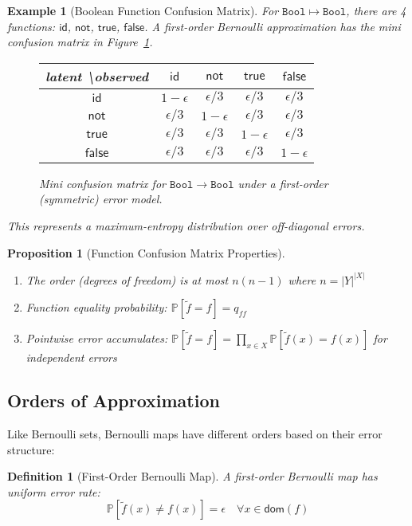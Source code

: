 \documentclass[11pt,final,hidelinks]{article}
\newtheorem{proposition}[theorem]{Proposition}
\newtheorem{definition}[theorem]{Definition}
\newtheorem{example}[theorem]{Example}
\newcommand{\obs}[1]{\widetilde{#1}}  %
\newcommand{\Type}[1]{\mathtt{#1}}
\newcommand{\Prob}[1]{\mathbb{P}\left[#1\right]}
\newcommand{\error}{\epsilon}
\newcommand{\Bool}{\Type{Bool}}
\newcommand{\Dom}{\mathsf{dom}}
\begin{document}
\begin{example}[Boolean Function Confusion Matrix]
For $\Bool \mapsto \Bool$, there are 4 functions: $\mathsf{id}$, $\mathsf{not}$, $\mathsf{true}$, $\mathsf{false}$. A first-order Bernoulli approximation has the mini confusion matrix in Figure~\ref{fig:bool-func-confusion}.
\begin{figure}[t]
\centering
\begin{tabular}{c|cccc}
latent \textbackslash observed & $\mathsf{id}$ & $\mathsf{not}$ & $\mathsf{true}$ & $\mathsf{false}$ \\
\hline
$\mathsf{id}$ & $1-\epsilon$ & $\epsilon/3$ & $\epsilon/3$ & $\epsilon/3$ \\
$\mathsf{not}$ & $\epsilon/3$ & $1-\epsilon$ & $\epsilon/3$ & $\epsilon/3$ \\
$\mathsf{true}$ & $\epsilon/3$ & $\epsilon/3$ & $1-\epsilon$ & $\epsilon/3$ \\
$\mathsf{false}$ & $\epsilon/3$ & $\epsilon/3$ & $\epsilon/3$ & $1-\epsilon$
\end{tabular}
\caption{Mini confusion matrix for $\Bool\to\Bool$ under a first-order (symmetric) error model.}
\label{fig:bool-func-confusion}
\end{figure}
This represents a maximum-entropy distribution over off-diagonal errors.
\end{example}

\begin{proposition}[Function Confusion Matrix Properties]
\begin{enumerate}
    \item The order (degrees of freedom) is at most $n(n-1)$ where $n = |Y|^{|X|}$
    \item Function equality probability: $\Prob{\obs{f} = f} = q_{ff}$
    \item Pointwise error accumulates: $\Prob{\obs{f} = f} = \prod_{x \in X} \Prob{\obs{f}(x) = f(x)}$ for independent errors
\end{enumerate}
\end{proposition}

\subsection{Orders of Approximation}

Like Bernoulli sets, Bernoulli maps have different orders based on their error structure:

\begin{definition}[First-Order Bernoulli Map]
A first-order Bernoulli map has uniform error rate:
\begin{equation}
\Prob{\obs{f}(x) \neq f(x)} = \error \quad \forall x \in \Dom(f)
\end{equation}
\end{definition}
\end{document}
